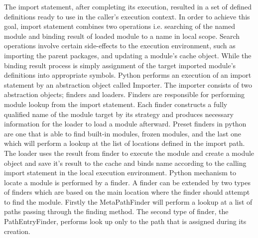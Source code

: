 The import statement, after completing its execution, resulted in a set of defined definitions ready to use in the caller’s execution context. In order to achieve this goal, import statement combines two operations i.e. searching of the named module and binding result of loaded module to a name in local scope. Search operations involve certain side-effects to the execution environment, such as importing the parent packages, and updating a module’s cache object. While the binding result process is simply assignment of the target imported module’s definitions into appropriate symbols.
Python performs an execution of an import statement by an abstraction object called Importer. The importer consists of two abstraction objects; finders and loaders. Finders are responsible for performing module lookup from the import statement. Each finder constructs a fully qualified name of the module target by its strategy and produces necessary information for the loader to load a module afterward. Preset finders in python are one that is able to find built-in modules, frozen modules, and the last one which will perform a lookup at the list of locations defined in the import path. The loader uses the result from finder to execute the module and create a module object  and save it’s result to the cache and binds name according to the calling import statement in the local execution environment.
Python mechanism to locate a module is performed by a finder. A finder can be extended by two types of finders which are based on the main location where the finder should attempt to find the module. Firstly the MetaPathFinder will perform a lookup at a list of paths passing through the finding method. The second type of finder, the PathEntryFinder, performs look up only to the path that is assigned during its creation.
